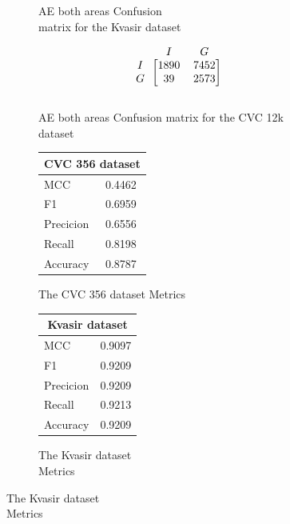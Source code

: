 \begin{figure}
\begin{subfigure}[b]{0.49\textwidth}
        
\caption{AE both areas Confusion\\ matrix for the Kvasir dataset}
\label{mat:kvasir_CM_DN121_AE_BOTH}
\end{subfigure}
\begin{subfigure}[b]{0.25\textwidth}
        \[
\begin{blockarray}{ccc}
& I & G  \\
\begin{block}{c[cc]}
 		I&1890 & 7452\\
        G&39  & 2573\\
\end{block}
\end{blockarray}
\]   
\caption{AE both areas Confusion matrix for the CVC 12k dataset}
\label{mat:cvc12k_CM_DN121_AE_BOTH}
\end{subfigure}
\caption{Confusion matrices for the three datasets}
\label{mat:CM_DN121_AE_SQUARE}
\begin{subfigure}[b]{0.25\textwidth}
\begin{tabular}{ll}      
        \toprule
        \multicolumn{2}{c}{CVC 356 dataset}        \\
        \midrule
        MCC 		& 0.4462 \\
        F1  		& 0.6959 \\
        Precicion  	& 0.6556 \\
        Recall      & 0.8198 \\
        Accuracy	& 0.8787 \\
        \bottomrule    
        \end{tabular}
\caption{The CVC 356 dataset Metrics}
\label{tab:cvc356_metrics_DN121_AE_BOTH}
\end{subfigure}%
\begin{subfigure}[b]{0.49\textwidth}
    	\centering
        \begin{tabular}{ll}
        \toprule
        \multicolumn{2}{c}{Kvasir dataset}        \\
        \midrule
        MCC 		& 0.9097 \\
        F1  		& 0.9209  \\
        Precicion  	& 0.9209 \\
        Recall     	& 0.9213  \\
        Accuracy	& 0.9209 \\
        \bottomrule
\end{tabular}
\caption{The Kvasir dataset\\ Metrics}
\label{tab:kvasir_metrics_DN121_AE_BOTH}

\end{subfigure}
\end{figure}
